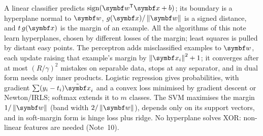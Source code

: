 \documentclass[11pt]{article}
\newcommand{\w}{\vect{w}}
\newcommand{\xt}{\tilde{\x}}
\newcommand{\sign}{\operatorname{sign}}
\begin{document}
\begin{keyidea}[Summary]
A linear classifier predicts $\sign(\w\T\x + b)$; its boundary is a hyperplane normal to $\w$, $g(\x)/\norm{\w}$ is a
signed distance, and $t\,g(\x)$ is the margin of an example. All the algorithms of this note learn hyperplanes, chosen by different
losses of the margin; least squares is pulled by distant easy points. The perceptron adds misclassified examples to $\w$, each update raising that example's
margin by $\norm{\x_i}^2 + 1$; it converges after at most $(R/\gamma)^2$ mistakes on separable data, stops at any separator,
and in dual form needs only inner products. Logistic regression gives probabilities, with gradient $\sum(y_i - t_i)\xt_i$
and a convex loss minimised by gradient descent or Newton/IRLS; softmax extends it to $m$ classes. The SVM maximises the
margin $1/\norm{\w}$ (band width $2/\norm{\w}$), depends only on its support vectors, and in soft-margin form is hinge loss plus ridge. No hyperplane
solves XOR: non-linear features are needed (Note~10).
\end{keyidea}
\end{document}
